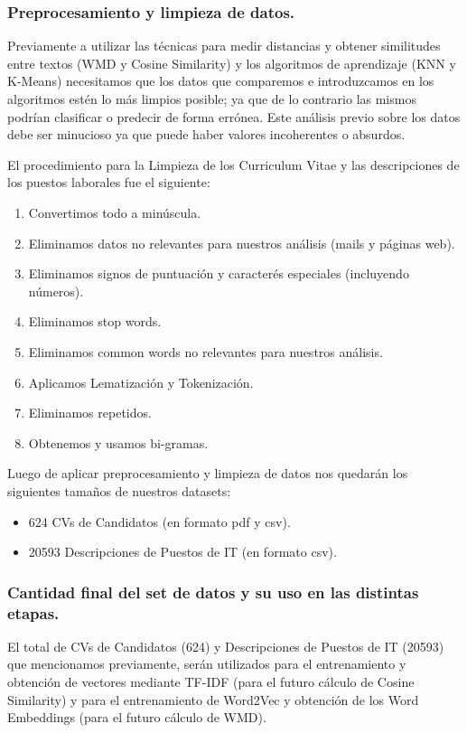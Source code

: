 \documentclass[12pt,a4paper]{article}
\begin{document}
\subsubsection{Preprocesamiento y limpieza de datos.}
Previamente a utilizar las técnicas para medir distancias y obtener similitudes entre textos (WMD y Cosine Similarity) y los algoritmos de aprendizaje (KNN y K-Means) necesitamos que los datos que comparemos e introduzcamos en los algoritmos estén lo más limpios posible; ya que de lo contrario las mismos podrían clasificar o predecir de forma errónea. Este análisis previo sobre los datos debe ser minucioso ya que puede haber valores incoherentes o absurdos.

El procedimiento para la Limpieza de los Curriculum Vitae y las descripciones de los puestos laborales fue el siguiente:

\begin{enumerate}
\item Convertimos todo a minúscula.
\item Eliminamos datos no relevantes para nuestros análisis (mails y páginas web).
\item Eliminamos signos de puntuación y caracterés especiales (incluyendo números).
\item Eliminamos stop words.
\item Eliminamos common words no relevantes para nuestros análisis.
\item Aplicamos Lematización y Tokenización.
\item Eliminamos repetidos.
\item Obtenemos y usamos bi-gramas.
\end{enumerate}

Luego de aplicar preprocesamiento y limpieza de datos nos quedarán los siguientes tamaños de nuestros datasets:
\begin{itemize}
\item 624 CVs de Candidatos (en formato pdf y csv).
\item 20593 Descripciones de Puestos de IT (en formato csv).
\end{itemize}

\subsubsection{Cantidad final del set de datos y su uso en las distintas etapas.}

El total de CVs de Candidatos (624) y Descripciones de Puestos de IT (20593) que mencionamos previamente, serán utilizados para el entrenamiento y obtención de vectores mediante TF-IDF (para el futuro cálculo de Cosine Similarity) y para el entrenamiento de Word2Vec y obtención de los Word Embeddings (para el futuro cálculo de WMD).
\end{document}
